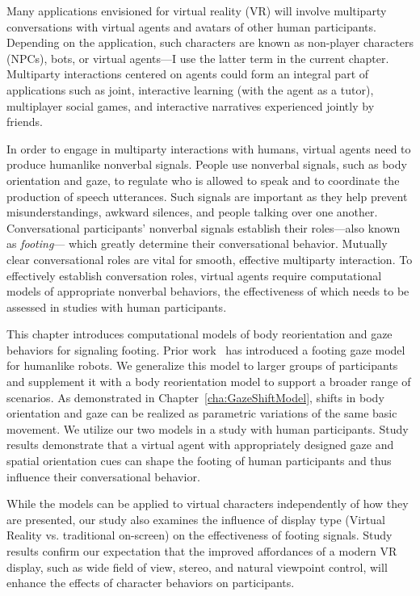 Many applications envisioned for virtual reality (VR) will involve multiparty conversations with virtual agents and avatars of other human participants.
Depending on the application, such characters are known as non-player characters (NPCs), bots, or virtual agents---I use the latter term in the current chapter.
Multiparty interactions centered on agents could form an integral part of applications such as joint, interactive learning (with the agent as a tutor), multiplayer social games, and interactive narratives experienced jointly by friends.

In order to engage in multiparty interactions with humans, virtual agents need to produce humanlike nonverbal signals.
People use nonverbal signals, such as body orientation and gaze, to regulate who is allowed to speak and to coordinate the production of speech utterances. Such signals are important as they help prevent misunderstandings, awkward silences, and people talking over one another. Conversational participants' nonverbal signals establish their roles---also known as \emph{footing}--- which greatly determine their conversational behavior.
Mutually clear conversational roles are vital for smooth, effective multiparty interaction.
To effectively establish conversation roles, virtual agents require computational models of appropriate nonverbal behaviors, the effectiveness of which needs to be assessed in studies with human participants.

This chapter introduces computational models of body reorientation and gaze behaviors for signaling footing. Prior work~\citep{mutlu2012conversational} has introduced a footing gaze model for humanlike robots. We generalize this model to larger groups of participants and supplement it with a body reorientation model to support a broader range of scenarios.
As demonstrated in Chapter~\ref{cha:GazeShiftModel}, shifts in body orientation and gaze can be realized as parametric variations of the same basic movement.
We utilize our two models in a study with human participants. Study results demonstrate that a virtual agent with appropriately designed gaze and spatial orientation cues can shape the footing of human participants and thus influence their conversational behavior.

While the models can be applied to virtual characters independently of how they are presented, our study also examines the influence of display type (Virtual Reality vs. traditional on-screen) on the effectiveness of footing signals. Study results confirm our expectation that the improved affordances of a modern VR display, such as wide field of view, stereo, and natural viewpoint control, will enhance the effects of character behaviors on participants.

